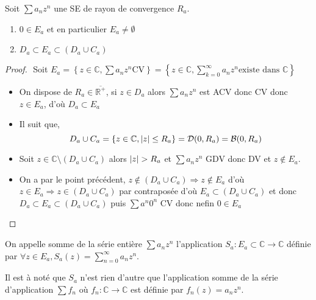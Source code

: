 \documentclass[11pt,hidelinks]{book}
\theoremstyle{mytheoremstyle}
\theoremstyle{mytheoremstyle}
\theoremstyle{mytheoremstyle}
\theoremstyle{mytheoremstyle}
\theoremstyle{mytheoremstyle}
\theoremstyle{mytheoremstyle}
\theoremstyle{mytheoremstyle}
\theoremstyle{mytheoremstyle}
\theoremstyle{myproblemstyle}
\def\mbb#1{\mathbb{#1}}
\def\mfc#1{\mathcal{#1}}
\def\bC{\mbb{C}}
\def\bR{\mbb{R}}
\def\se{\sum a_n z^n}
\newcommand{\func}[3]{#1\colon#2\to#3}
\newcommand{\parenth}[1]{\left(#1\right)}
\begin{document}
\begin{adjustwidth}{-2em}{-1em}
\begin{prop}
    Soit $\se$ une SE de rayon de convergence $R_a$.
    \begin{enumerate} 
    \item $0 \in E_a$ et en particulier $E_a \not= \emptyset$  
    \item $D_a \subset E_a \subset \parenth{D_a \cup C_a}$ 
    \end{enumerate}
    \begin{proof}$ $\newline
        Soit $E_a = \left\{z \in \bC, \se \text{CV}\right\} = \left\{z \in \bC , \sum_{k=0}^{\infty} a_n z^n \text{existe dans $\bC$}\right\}$
        \begin{itemize}         
        \item On dispose de $R_a \in \overline{\bR^+}$, si $z \in D_a$ alors $\se$ est ACV donc CV donc $z \in E_a$, d'où $D_a \subset E_a$
         
        \item Il suit que, 
        \begin{equation*}
            D_a \cup C_a = \{z \in \bC, \abs{z} \leq R_a\} = \mfc{D}(0, R_a) = \mfc{B}(0, R_a)
        \end{equation*}
         
        \item Soit $z \in \bC \setminus (D_a \cup C_a)$ alors $\abs{z} > R_a$ 
        et $\se$ GDV donc DV et $z \not \in E_a$. 
        \item On a par le point précédent, $z \not \in (D_a \cup C_a) \Rightarrow z \not \in E_a$ d'où 
        $z \in E_a \Rightarrow z \in (D_a \cup C_a)$ par contraposée 
        d'où $E_a \subset (D_a \cup C_a)$ et donc 
        $D_a \subset E_a \subset (D_a \cup C_a)$
        puis $\sum a^n 0^n$ CV donc nefin $0 \in E_a$ 
    \end{itemize}
    \end{proof}
\end{prop}
\end{adjustwidth}
\begin{definition}
    On appelle somme de la série entière $\se$ l'application
    $\func{S_a}{E_a \subset \bC}{\bC}$ définie par 
    $\forall z \in E_a, S_a(z) = \sum_{n=0}^{\infty} a_n z^n$.
\end{definition}
\begin{rmq}
    Il est à noté que $S_a$ n'est rien d'autre que l'application somme 
    de la série d'application $\sum f_n$ où $\func{f_n}{\bC}{\bC}$ est définie 
    par $f_n(z) = a_n z^n$.
\end{rmq}
\end{document}
